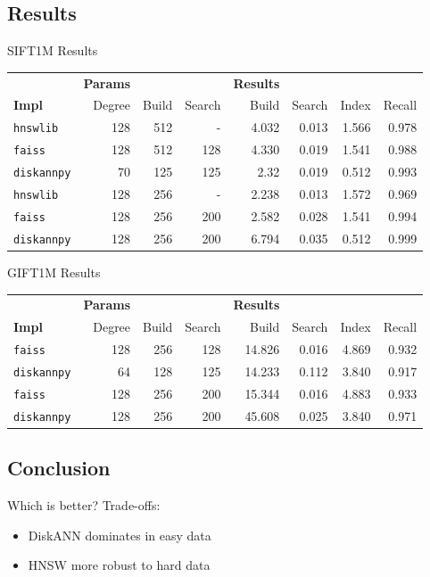 \subsection{Results}

\begin{frame}{SIFT1M Results}
    \begin{table}[ht]
        \begin{tabular}{l|rrr|rrrr}
            \toprule
            & \textbf{Params} & & & \textbf{Results} & & \\
            \textbf{Impl} & Degree & Build & Search & Build & Search & Index & Recall \\
            \midrule
            \texttt{hnswlib} & 128 & 512 & - & 4.032 & 0.013 & 1.566 & 0.978 \\
            \texttt{faiss} & 128 & 512 & 128 & 4.330 & 0.019 & 1.541 & 0.988 \\
            \texttt{diskannpy} & 70 & 125 & 125 & 2.32 & 0.019 & 0.512 & 0.993 \\
            \midrule
            \texttt{hnswlib} & 128 & 256 & - & 2.238 & 0.013 & 1.572 & 0.969 \\
            \texttt{faiss} & 128 & 256 & 200 & 2.582 & 0.028 & 1.541 & 0.994  \\
            \texttt{diskannpy} & 128 & 256 & 200 & 6.794 & 0.035 & 0.512 & 0.999 \\
            \bottomrule
        \end{tabular}
    \end{table}
\end{frame}

\begin{frame}{GIFT1M Results}
    \begin{table}[ht]
        \begin{tabular}{l|rrr|rrrr}
            \toprule
            & \textbf{Params} & & & \textbf{Results} & & \\
            \textbf{Impl} & Degree & Build & Search & Build & Search & Index & Recall \\
            \midrule
            \texttt{faiss} & 128 & 256 & 128 & 14.826 & 0.016 & 4.869 & 0.932 \\
            \texttt{diskannpy} & 64 & 128 & 125 & 14.233 & 0.112 & 3.840 & 0.917 \\
            \midrule
            \texttt{faiss} & 128 & 256 & 200 & 15.344 & 0.016 & 4.883 & 0.933 \\
            \texttt{diskannpy} & 128 & 256 & 200 & 45.608 & 0.025 & 3.840 & 0.971 \\
            \bottomrule
        \end{tabular}
    \end{table}
\end{frame}

\subsection{Conclusion}

\begin{frame}{Which is better?}
    Trade-offs:
    \begin{itemize}
        \item DiskANN dominates in easy data
        \item HNSW more robust to hard data
    \end{itemize}
\end{frame}
